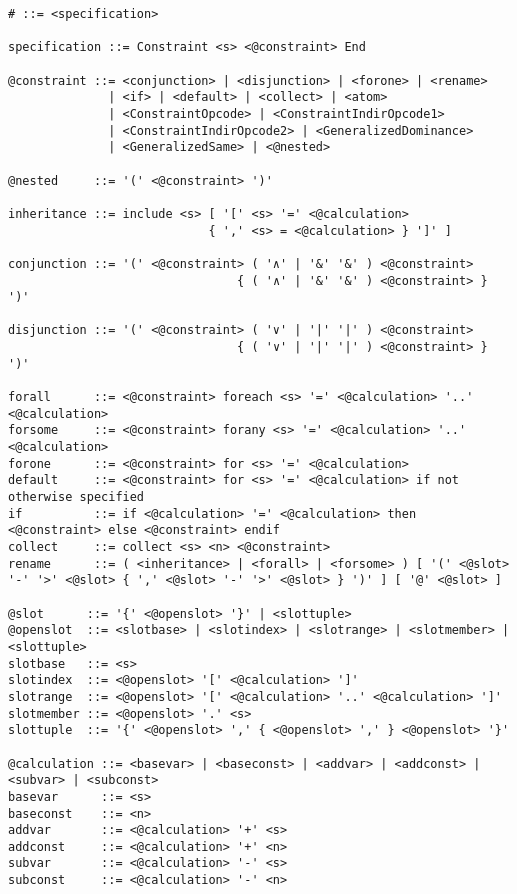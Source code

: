 \begin{lstlisting}[language=BNF,basicstyle=\small\ttfamily,
                   numbers=none,framexleftmargin=0pt,xleftmargin=0pt,]
# ::= <specification>

specification ::= Constraint <s> <@constraint> End

@constraint ::= <conjunction> | <disjunction> | <forone> | <rename>
              | <if> | <default> | <collect> | <atom>
              | <ConstraintOpcode> | <ConstraintIndirOpcode1>
              | <ConstraintIndirOpcode2> | <GeneralizedDominance>
              | <GeneralizedSame> | <@nested>

@nested     ::= '(' <@constraint> ')'

inheritance ::= include <s> [ '[' <s> '=' <@calculation>
                            { ',' <s> = <@calculation> } ']' ]

conjunction ::= '(' <@constraint> ( '∧' | '&' '&' ) <@constraint>
                                { ( '∧' | '&' '&' ) <@constraint> } ')'

disjunction ::= '(' <@constraint> ( '∨' | '|' '|' ) <@constraint>
                                { ( '∨' | '|' '|' ) <@constraint> } ')'

forall      ::= <@constraint> foreach <s> '=' <@calculation> '..' <@calculation>
forsome     ::= <@constraint> forany <s> '=' <@calculation> '..' <@calculation>
forone      ::= <@constraint> for <s> '=' <@calculation>
default     ::= <@constraint> for <s> '=' <@calculation> if not otherwise specified
if          ::= if <@calculation> '=' <@calculation> then <@constraint> else <@constraint> endif
collect     ::= collect <s> <n> <@constraint>
rename      ::= ( <inheritance> | <forall> | <forsome> ) [ '(' <@slot> '-' '>' <@slot> { ',' <@slot> '-' '>' <@slot> } ')' ] [ '@' <@slot> ]

@slot      ::= '{' <@openslot> '}' | <slottuple>
@openslot  ::= <slotbase> | <slotindex> | <slotrange> | <slotmember> | <slottuple>
slotbase   ::= <s>
slotindex  ::= <@openslot> '[' <@calculation> ']'
slotrange  ::= <@openslot> '[' <@calculation> '..' <@calculation> ']'
slotmember ::= <@openslot> '.' <s>
slottuple  ::= '{' <@openslot> ',' { <@openslot> ',' } <@openslot> '}'

@calculation ::= <basevar> | <baseconst> | <addvar> | <addconst> | <subvar> | <subconst>
basevar      ::= <s>
baseconst    ::= <n>
addvar       ::= <@calculation> '+' <s>
addconst     ::= <@calculation> '+' <n>
subvar       ::= <@calculation> '-' <s>
subconst     ::= <@calculation> '-' <n>


\end{lstlisting}
